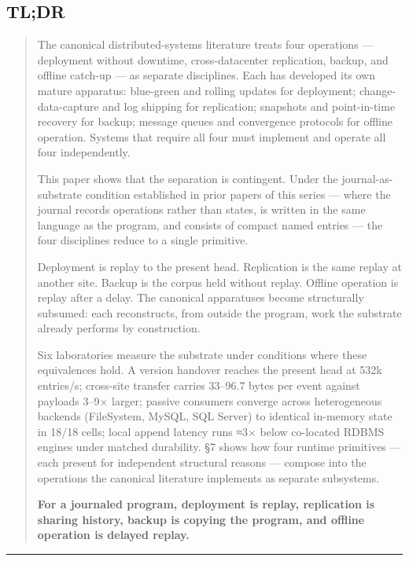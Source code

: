 \documentclass[
]{article}
\begin{document}
\subsection{TL;DR}\label{tldr}

\begin{quote}
The canonical distributed-systems literature treats four operations ---
deployment without downtime, cross-datacenter replication, backup, and
offline catch-up --- as separate disciplines. Each has developed its own
mature apparatus: blue-green and rolling updates for deployment;
change-data-capture and log shipping for replication; snapshots and
point-in-time recovery for backup; message queues and convergence
protocols for offline operation. Systems that require all four must
implement and operate all four independently.

This paper shows that the separation is contingent. Under the
journal-as-substrate condition established in prior papers of this
series --- where the journal records operations rather than states, is
written in the same language as the program, and consists of compact
named entries --- the four disciplines reduce to a single primitive.

Deployment is replay to the present head. Replication is the same replay
at another site. Backup is the corpus held without replay. Offline
operation is replay after a delay. The canonical apparatuses become
structurally subsumed: each reconstructs, from outside the program, work
the substrate already performs by construction.

Six laboratories measure the substrate under conditions where these
equivalences hold. A version handover reaches the present head at 532k
entries/s; cross-site transfer carries 33--96.7 bytes per event against
payloads 3--9× larger; passive consumers converge across heterogeneous
backends (FileSystem, MySQL, SQL Server) to identical in-memory state in
18/18 cells; local append latency runs ≈3× below co-located RDBMS
engines under matched durability. §7 shows how four runtime primitives
--- each present for independent structural reasons --- compose into the
operations the canonical literature implements as separate subsystems.

\textbf{For a journaled program, deployment is replay, replication is
sharing history, backup is copying the program, and offline operation is
delayed replay.}
\end{quote}

\begin{center}\rule{0.5\linewidth}{0.5pt}\end{center}
\end{document}

